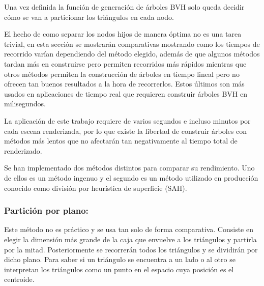 Una vez definida la función de generación de árboles BVH solo queda decidir cómo se van a particionar los triángulos en cada nodo.

El hecho de como separar los nodos hijos de manera óptima no es una tarea trivial, en esta sección se mostrarán comparativas mostrando como los tiempos de recorrido varían dependiendo del método elegido, además de que algunos métodos tardan más en construirse pero permiten recorridos más rápidos mientras que otros métodos permiten la construcción de árboles en tiempo lineal pero no ofrecen tan buenos resultados a la hora de recorrerlos. Estos últimos son más usados en aplicaciones de tiempo real que requieren construir árboles BVH en milisegundos.

La aplicación de este trabajo requiere de varios segundos e incluso minutos por cada escena renderizada, por lo que existe la libertad de construir árboles con métodos más lentos que no afectarán tan negativamente al tiempo total de renderizado.

Se han implementado dos métodos distintos para comparar su rendimiento. Uno de ellos es un método ingenuo y el segundo es un método utilizado en producción conocido como división por heurística de superficie (SAH).

\subsubsection{Partición por plano:}

Este método no es práctico y se usa tan solo de forma comparativa. Consiste en elegir la dimensión más grande de la caja que envuelve a los triángulos y partirla por la mitad. Posteriormente se recorrerán todos los triángulos y se dividirán por dicho plano. Para saber si un triángulo se encuentra a un lado o al otro se interpretan los triángulos como un punto en el espacio cuya posición es el centroide.

